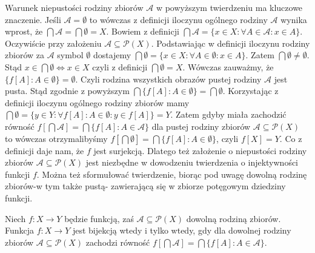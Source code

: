 \begin{remark}
Warunek niepustości rodziny zbiorów $\mathcal{A}$ w powyższym twierdzeniu ma kluczowe znaczenie. Jeśli $\mathcal{A}=\emptyset$ to wówczas z definicji iloczynu ogólnego rodziny $\mathcal{A}$ wynika wprost, że $\bigcap\mathcal{A}=\bigcap\mathcal{\emptyset}=X$. Bowiem z definicji $\bigcap\mathcal{A}=\{x\in X:\forall A\in\mathcal{A}:x\in A\}$. Oczywiście przy założeniu $\mathcal{A}\subseteq\mathcal{P}(X)$. Podstawiając w definicji iloczynu rodziny zbiorów za $\mathcal{A}$ symbol $\emptyset$ dostajemy $\bigcap\emptyset=\{x\in X:\forall A\in\emptyset: x\in A\}$. Zatem $\bigcap\emptyset\ne\emptyset$. Stąd $x\in\bigcap\emptyset\iff x\in X$ czyli z definicji $\bigcap\emptyset=X$. Wówczas zauważmy, że $\{f[A]:A\in\emptyset\}=\emptyset$. Czyli rodzina wszystkich obrazów pustej rodziny $\mathcal{A}$ jest pusta. Stąd zgodnie z powyższym $\bigcap\{f[A]:A\in\emptyset\}=\bigcap\emptyset$. Korzystając z definicji iloczynu ogólnego rodziny zbiorów mamy $\bigcap\emptyset=\{y\in Y:\forall f[A]:A\in\emptyset:y\in f[A]\}=Y$. Zatem gdyby miała zachodzić równość $f[\bigcap\mathcal{A}]=\bigcap\{f[A]:A\in\mathcal{A}\}$ dla pustej rodziny zbiorów $\mathcal{A}\subseteq\mathcal{P}(X)$ to wówczas otrzymalibyśmy $f[\bigcap\emptyset]=\bigcap\{f[A]:A\in\emptyset\}$, czyli $f[X]=Y$. Co z definicji daje nam, że $f$ jest surjekcją. Dlatego też założenie o niepustości rodziny zbiorów $\mathcal{A}\subseteq\mathcal{P}(X)$ jest niezbędne w dowodzeniu twierdzenia o injektywności funkcji $f$. Można też sformułować twierdzenie, biorąc pod uwagę dowolną rodzinę zbiorów-w tym także pustą- zawierającą się w zbiorze potęgowym dziedziny funkcji.
\end{remark}
\begin{theorem}
Niech $f:X\rightarrow Y$ będzie funkcją, zaś $\mathcal{A}\subseteq\mathcal{P}(X)$ dowolną rodziną zbiorów. Funkcja $f:X\rightarrow Y$ jest bijekcją wtedy i tylko wtedy, gdy dla dowolnej rodziny zbiorów $\mathcal{A}\subseteq\mathcal{P}(X)$ zachodzi równość $f[\bigcap\mathcal{A}]=\bigcap\{f[A]:A\in\mathcal{A}\}$.
\end{theorem}
